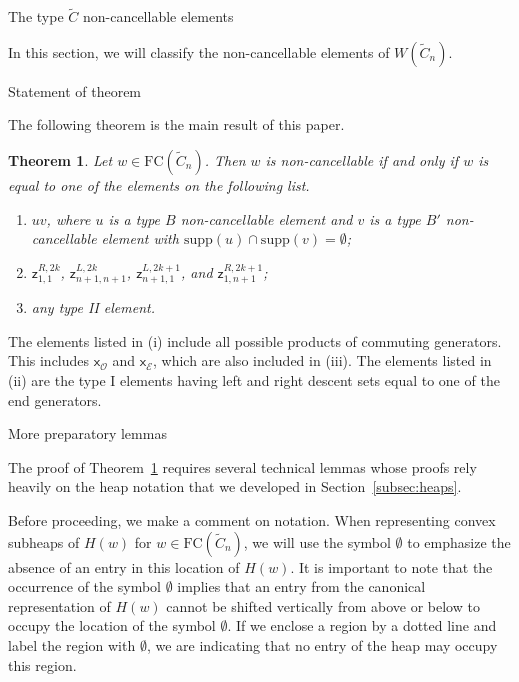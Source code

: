\documentclass[12pt]{amsart}
\newtheorem{thm}{Theorem}[subsection]
\newcommand{\C}{\widetilde{C}}
\renewcommand{\O}{\mathcal{O}}
\newcommand{\E}{\mathcal{E}}
\newcommand{\z}{\mathsf{z}}
\newcommand{\x}{\mathsf{x}}
\newcommand{\supp}{\mathrm{supp}}
\renewcommand{\(}{\left(}
\renewcommand{\)}{\right)}
\newcommand{\FC}{\mathrm{FC}}
\begin{document}
\begin{section}{The type $\C$ non-cancellable elements}\label{sec:Cwsrm}

In this section, we will classify the non-cancellable elements of $W(\C_{n})$.  


\begin{subsection}{Statement of theorem}

The following theorem is the main result of this paper.

\begin{thm}\label{thm:affineCwsrm}
Let $w \in \FC(\C_{n})$.  Then $w$ is non-cancellable if and only if $w$ is equal to one of the elements on the following list.
\begin{enumerate}[label=\rm{(\roman*)}]
\item $uv$, where $u$ is a type $B$ non-cancellable element and $v$ is a type $B'$ non-cancellable element with $\supp(u)\cap \supp(v)=\emptyset$;
\item $\z^{R,2k}_{1,1}$, $\z^{L,2k}_{n+1,n+1}$, $\z^{L,2k+1}_{n+1,1}$, and $\z^{R,2k+1}_{1,n+1}$; 
\item any type II element.
\end{enumerate}
\end{thm}

The elements listed in (i) include all possible products of commuting generators.  This includes $\x_{\O}$ and $\x_{\E}$, which are also included in (iii).  The elements listed in (ii) are the type I elements having left and right descent sets equal to one of the end generators.

\end{subsection}


\begin{subsection}{More preparatory lemmas}

The proof of Theorem~\ref{thm:affineCwsrm} requires several technical lemmas whose proofs rely heavily on the heap notation that we developed in Section~\ref{subsec:heaps}.

Before proceeding, we make a comment on notation.  When representing convex subheaps of $H(w)$ for $w\in \FC(\C_n)$, we will use the symbol $\emptyset$ to emphasize the absence of an entry in this location of $H(w)$.  It is important to note that the occurrence of the symbol $\emptyset$  implies that an entry from the canonical representation of $H(w)$ cannot be shifted vertically from above or below to occupy the location of the symbol $\emptyset$.  If we enclose a region by a dotted line and label the region with $\emptyset$, we are indicating that no entry of the heap may occupy this region.


\end{subsection}
\end{section}
\end{document}
